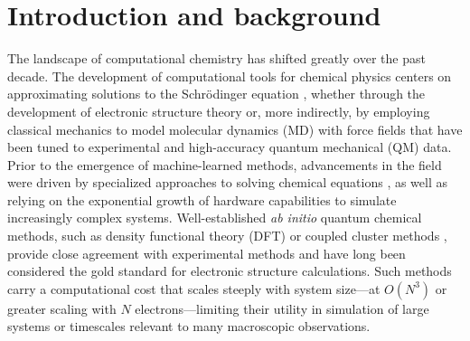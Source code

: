 \chapter{Introduction and background} 
\label{top_of_intro}
The landscape of computational chemistry has shifted greatly over the past decade. 
The development of computational tools for chemical physics centers on approximating solutions to the Schr{\"o}dinger equation \cite{schrodinger_eqn}, whether through the development of electronic structure theory or, more indirectly, by employing classical mechanics to model molecular dynamics (MD) with force fields that have been tuned to experimental and high-accuracy quantum mechanical (QM) data.
Prior to the emergence of machine-learned methods, advancements in the field were driven by specialized approaches to solving chemical equations \cite{trp_cage_roitberg, dft_qm_mm_roitberg}, 
as well as relying on the exponential growth of hardware capabilities to simulate increasingly complex systems.
Well-established \textit{ab initio} quantum chemical methods, such as density functional theory (DFT) \cite{dft_first_paper, perspective_fifty_years_DFT, wB97X}
or coupled cluster methods \cite{coupled_cluster_first_paper, ccsd(t)_f12, dplno_ccsd(t)*},
provide close agreement with experimental methods and have long been considered the gold standard for electronic structure calculations.
Such methods carry a computational cost that scales steeply with system size---at $O(N^3)$ or greater scaling with $N$ electrons---limiting their utility in simulation of large systems or timescales relevant to many macroscopic observations. 

